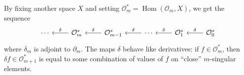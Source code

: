 By fixing another space \(X\) and setting \(\mathcal{O}_{m}^{\ast} = \operatorname{Hom}(\mathcal{O}_{m}, X)\), we get the sequence
\[\begin{tikzcd}
	\cdots & {\mathcal{O}_{m}^{\ast}} & {\mathcal{O}_{m - 1}^{\ast}} & \cdots & {\mathcal{O}_{1}^{\ast}} & {\mathcal{O}_{0}^{\ast}}
	\arrow["\delta"', from=1-2, to=1-1]
	\arrow["\delta"', from=1-3, to=1-2]
	\arrow["\delta"', from=1-4, to=1-3]
	\arrow["\delta"', from=1-5, to=1-4]
	\arrow["\delta"', from=1-6, to=1-5]
\end{tikzcd}\]
where \(\delta_{m}\) is adjoint to \(\partial_{m}\). The maps \(\delta\) behave like derivatives: if \(f \in \mathcal{O}_{m}^{\ast}\), then \(\delta f \in \mathcal{O}_{m + 1}^{\ast}\) is equal to some combination of values of \(f\) on ``close'' \(m\)-singular elements.

